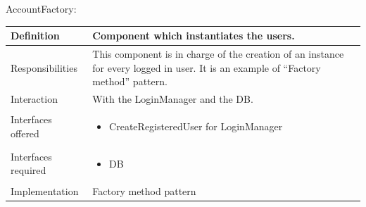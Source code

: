\documentclass[a4paper,11pt]{report} %
\begin{document}
	\pagebreak
	\centerline{AccountFactory:}
	\begin{center}
		\begin{tabular}{| l | p{9cm} |}\hline
			Definition & Component which instantiates the users.\\\hline
			Responsibilities & This component is in charge of the creation of an instance for every logged in user. It is an example of ``Factory method'' pattern.\\\hline
			Interaction & With the LoginManager and the DB.\\\hline
			Interfaces offered & \begin{itemize}
				\item CreateRegisteredUser for LoginManager
			\end{itemize}\\\hline
			Interfaces required & \begin{itemize}
				\item DB
			\end{itemize}\\\hline
			Implementation & Factory method pattern\\\hline
		\end{tabular}
	\end{center}
			
	\pagebreak
\end{document}
